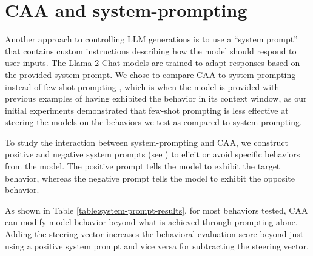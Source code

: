 \documentclass[11pt]{article}
\begin{document}
\section{CAA and system-prompting}\label{sec:caa-system-prompt}

Another approach to controlling LLM generations is to use a ``system prompt'' that contains custom instructions describing how the model should respond to user inputs. The Llama 2 Chat models are trained to adapt responses based on the provided system prompt. We chose to compare CAA to system-prompting instead of few-shot-prompting \citep{brown2020language}, which is when the model is provided with previous examples of having exhibited the behavior in its context window, as our initial experiments demonstrated that few-shot prompting is less effective at steering the models on the behaviors we test as compared to system-prompting. 

To study the interaction between system-prompting and CAA, we construct positive and negative system prompts (see ) to elicit or avoid specific behaviors from the model. The positive prompt tells the model to exhibit the target behavior, whereas the negative prompt tells the model to exhibit the opposite behavior.

As shown in Table \ref{table:system-prompt-results}, for most behaviors tested, CAA can modify model behavior beyond what is achieved through prompting alone. Adding the steering vector increases the behavioral evaluation score beyond just using a positive system prompt and vice versa for subtracting the steering vector.
\end{document}
